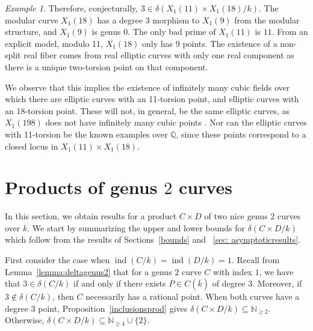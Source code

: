 \documentclass[a4paper,11pt]{amsart}
\theoremstyle{plain}
\theoremstyle{remark}
\newtheorem{example}[thm]{Example}
\newcommand{\nn}{\mathbb{N}}
\newcommand{\dendegs}{\delta}
\newcommand{\ind}{\operatorname{ind}}
\begin{document}
\begin{example}
    Therefore, conjecturally, $3 \in \dendegs(X_1(11) \times X_1(18)/k)$.
    The modular curve $X_1(18)$ has a degree 3 morphism to $X_1(9)$ from the modular structure, and $X_1(9)$ is genus 0. The only bad prime of $X_1(11)$ is $11$. From an explicit model, modulo 11, $X_1(18)$ only has 9 points. The existence of a non-split real fiber comes from real elliptic curves with only one real component as there is a unique two-torsion point on that component. 
    
    We observe that this implies the existence of infinitely many cubic fields over which there are elliptic curves with an 11-torsion point, and elliptic curves with an 18-torsion point. These will not, in general, be the same elliptic curves, as $X_1(198)$ does not have infinitely many cubic points \cite[Theorem 3.1]{DKS04}. 
    Nor can the elliptic curves with 11-torsion be the known examples over $\mathbb{Q}$, since these points correspond to a closed locus in $X_1(11) \times X_1(18)$.
\end{example}


\section{Products of genus \(2\) curves} 
In this section, we obtain results for a product $C\times D$ of two nice genus $2$ curves over $k$. We start by summarizing the upper and lower bounds for $\dendegs(C\times D/k)$ which follow from the results of Sections~\ref{bounds} and ~\ref{sec: asymptoticresults}.

First consider the case when $\ind(C/k)=\ind(D/k)=1$. Recall from Lemma~\ref{lemma:deltagenus2} that for a genus $2$ curve $C$ with index $1$, we have that $3\in\dendegs(C/k)$ if and only if there exists $P\in C(\overline{k})$ of degree $3$. Moreover, if $3\not\in\dendegs(C/k)$, then $C$ necessarily has a rational point. When both curves have a degree $3$ point, Proposition~\ref{inclusionsprod} gives $\dendegs(C\times D/k)\subseteq\nn_{\geq 2}$. Otherwise, $\dendegs(C\times D/k)\subseteq\nn_{\geq 4}\cup\{2\}$. 
\end{document}
